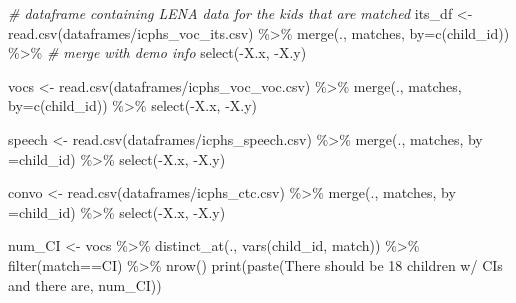 \documentclass[
]{article}
\newenvironment{Shaded}{\begin{snugshade}}{\end{snugshade}}
\newcommand{\AttributeTok}[1]{\textcolor[rgb]{0.77,0.63,0.00}{#1}}
\newcommand{\CommentTok}[1]{\textcolor[rgb]{0.56,0.35,0.01}{\textit{#1}}}
\newcommand{\FunctionTok}[1]{\textcolor[rgb]{0.00,0.00,0.00}{#1}}
\newcommand{\NormalTok}[1]{#1}
\newcommand{\OtherTok}[1]{\textcolor[rgb]{0.56,0.35,0.01}{#1}}
\newcommand{\SpecialCharTok}[1]{\textcolor[rgb]{0.00,0.00,0.00}{#1}}
\newcommand{\StringTok}[1]{\textcolor[rgb]{0.31,0.60,0.02}{#1}}
\begin{document}
\begin{Shaded}
\begin{Highlighting}[]
\CommentTok{\# dataframe containing LENA data for the kids that are matched}
\NormalTok{its\_df }\OtherTok{\textless{}{-}} \FunctionTok{read.csv}\NormalTok{(}\StringTok{\textquotesingle{}dataframes/icphs\_voc\_its.csv\textquotesingle{}}\NormalTok{) }\SpecialCharTok{\%\textgreater{}\%}
  \FunctionTok{merge}\NormalTok{(., matches, }\AttributeTok{by=}\FunctionTok{c}\NormalTok{(}\StringTok{\textquotesingle{}child\_id\textquotesingle{}}\NormalTok{)) }\SpecialCharTok{\%\textgreater{}\%} \CommentTok{\# merge with demo info}
  \FunctionTok{select}\NormalTok{(}\SpecialCharTok{{-}}\NormalTok{X.x, }\SpecialCharTok{{-}}\NormalTok{X.y)}

\NormalTok{vocs }\OtherTok{\textless{}{-}} \FunctionTok{read.csv}\NormalTok{(}\StringTok{\textquotesingle{}dataframes/icphs\_voc\_voc.csv\textquotesingle{}}\NormalTok{) }\SpecialCharTok{\%\textgreater{}\%}
  \FunctionTok{merge}\NormalTok{(., matches, }\AttributeTok{by=}\FunctionTok{c}\NormalTok{(}\StringTok{\textquotesingle{}child\_id\textquotesingle{}}\NormalTok{)) }\SpecialCharTok{\%\textgreater{}\%} 
  \FunctionTok{select}\NormalTok{(}\SpecialCharTok{{-}}\NormalTok{X.x, }\SpecialCharTok{{-}}\NormalTok{X.y)}

\NormalTok{speech }\OtherTok{\textless{}{-}} \FunctionTok{read.csv}\NormalTok{(}\StringTok{\textquotesingle{}dataframes/icphs\_speech.csv\textquotesingle{}}\NormalTok{) }\SpecialCharTok{\%\textgreater{}\%}
  \FunctionTok{merge}\NormalTok{(., matches, }\AttributeTok{by =}\StringTok{\textquotesingle{}child\_id\textquotesingle{}}\NormalTok{) }\SpecialCharTok{\%\textgreater{}\%} 
  \FunctionTok{select}\NormalTok{(}\SpecialCharTok{{-}}\NormalTok{X.x, }\SpecialCharTok{{-}}\NormalTok{X.y)}

\NormalTok{convo }\OtherTok{\textless{}{-}} \FunctionTok{read.csv}\NormalTok{(}\StringTok{\textquotesingle{}dataframes/icphs\_ctc.csv\textquotesingle{}}\NormalTok{) }\SpecialCharTok{\%\textgreater{}\%}
  \FunctionTok{merge}\NormalTok{(., matches, }\AttributeTok{by =}\StringTok{\textquotesingle{}child\_id\textquotesingle{}}\NormalTok{) }\SpecialCharTok{\%\textgreater{}\%} 
  \FunctionTok{select}\NormalTok{(}\SpecialCharTok{{-}}\NormalTok{X.x, }\SpecialCharTok{{-}}\NormalTok{X.y)}
\end{Highlighting}
\end{Shaded}

\begin{Shaded}
\begin{Highlighting}[]
\NormalTok{num\_CI }\OtherTok{\textless{}{-}}\NormalTok{ vocs }\SpecialCharTok{\%\textgreater{}\%} 
  \FunctionTok{distinct\_at}\NormalTok{(., }\FunctionTok{vars}\NormalTok{(child\_id, match)) }\SpecialCharTok{\%\textgreater{}\%}
  \FunctionTok{filter}\NormalTok{(match}\SpecialCharTok{==}\StringTok{\textquotesingle{}CI\textquotesingle{}}\NormalTok{) }\SpecialCharTok{\%\textgreater{}\%}
  \FunctionTok{nrow}\NormalTok{()}
\FunctionTok{print}\NormalTok{(}\FunctionTok{paste}\NormalTok{(}\StringTok{\textquotesingle{}There should be 18 children w/ CIs and there are\textquotesingle{}}\NormalTok{, num\_CI))}
\end{Highlighting}
\end{Shaded}
\end{document}

